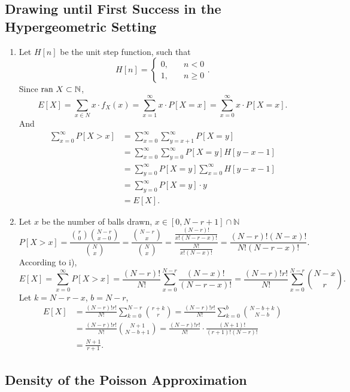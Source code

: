 \documentclass[11pt,a4paper]{article}
\author{Group 37}
\subtitle{Assignment}
\begin{document}
\maketitle

\subsection{Drawing until First Success in the Hypergeometric Setting}

\begin{enumerate}[label=\roman*)]
\item
Let $H[n]$ be the unit step function, such that 
$$H[n]=\left\{\begin{aligned}
0,&\quad n<0\\1,&\quad n\geqslant 0
\end{aligned}\right..$$
Since ${\rm ran}\ X\subset \mathbb{N}$,
$$E[X]=\sum_{x\in N}x\cdot f_X(x)=\sum_{x=1}^\infty x\cdot P[X=x]=\sum_{x=0}^\infty x\cdot P[X=x].$$
And
\begin{align*}
\sum_{x=0}^\infty P[X>x]
&=\sum_{x=0}^\infty\sum_{y=x+1}^\infty P[X=y]\\
&=\sum_{x=0}^\infty\sum_{y=0}^\infty P[X=y]H[y-x-1]\\
&=\sum_{y=0}^\infty P[X=y]\sum_{x=0}^\infty H[y-x-1]\\
&=\sum_{y=0}^\infty P[X=y]\cdot y\\
&=E[X].
\end{align*}
\item
Let $x$ be the number of balls drawn, $x\in [0,N-r+1]\cap\mathbb{N}$
$$P[X>x]=\frac{\binom{r}{0}\binom{N-r}{x-0}}{\binom{N}{x}}=\frac{\binom{N-r}{x}}{\binom{N}{x}}=\frac{\frac{(N-r)!}{x!(N-r-x)!}}{\frac{N!}{x!(N-x)!}}=\frac{(N-r)!(N-x)!}{N!(N-r-x)!}.$$
According to i),
$$E[X]=\sum_{x=0}^\infty P[X>x]=\frac{(N-r)!}{N!}\sum_{x=0}^{N-r} \frac{(N-x)!}{(N-r-x)!}=\frac{(N-r)!r!}{N!}\sum_{x=0}^{N-r}\binom{N-x}{r}.$$
Let $k=N-r-x$, $b=N-r$,
\begin{align*}
E[X]&=\frac{(N-r)!r!}{N!}\sum_{k=0}^{N-r}\binom{r+k}{r}
=\frac{(N-r)!r!}{N!}\sum_{k=0}^{b}\binom{N-b+k}{N-b}\\
&=\frac{(N-r)!r!}{N!}\binom{N+1}{N-b+1}
=\frac{(N-r)!r!}{N!}\cdot\frac{(N+1)!}{(r+1)!(N-r)!}\\
&=\frac{N+1}{r+1}.
\end{align*}
\end{enumerate}

\subsection{Density of the Poisson Approximation}
\end{document}
